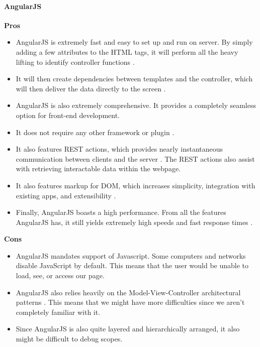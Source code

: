 	\paragraph{AngularJS}
	\textbf{Pros}
		\begin{itemize}
			\item AngularJS is extremely fast and easy to set up and run on server. By simply adding a few attributes to the HTML tags, it will perform all the heavy lifting to identify controller functions \cite{angularjsPC}. 
			\item It will then create dependencies between templates and the controller, which will then deliver the data directly to the screen \cite{angularjs}. 
			\item AngularJS is also extremely comprehensive. It provides a completely seamless option for front-end development. 
			\item It does not require any other framework or plugin \cite{angularjsPC}. 
			\item It also features REST actions, which provides nearly instantaneous communication between clients and the server \cite{angularjs}. The REST actions also assist with retrieving interactable data within the webpage. 
			\item It also features markup for DOM, which increases simplicity, integration with existing apps, and extensibility \cite{angularjs}. 
			\item Finally, AngularJS boasts a high performance. From all the features AngularJS has, it still yields extremely high speeds and fast response times \cite{angularjsPC}.
		\end{itemize}
  \textbf{Cons}
		\begin{itemize}
			\item AngularJS mandates support of Javascript. Some computers and networks disable JavaScript by default. This means that the user would be unable to load, see, or access our page. 
			\item AngularJS also relies heavily on the Model-View-Controller architectural patterns \cite{angularjsPC}. This means that we might have more difficulties since we aren't completely familiar with it. 
			\item Since AngularJS is also quite layered and hierarchically arranged, it also might be difficult to debug scopes.
		\end{itemize}
